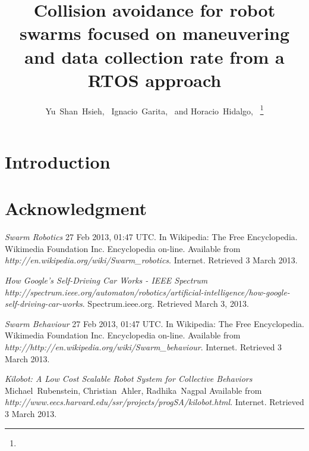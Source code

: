 \documentclass[journal]{IEEEtran}
\begin{document}
\title{Collision avoidance for robot swarms focused on maneuvering and data collection rate from a RTOS approach}

\author{Yu~Shan~Hsieh,~
   Ignacio~Garita,~
   and Horacio~Hidalgo,~%
\thanks{}%
%
}

\maketitle

\begin{abstract}

\end{abstract}

\section{Introduction}

\section*{Acknowledgment}

\ifCLASSOPTIONcaptionsoff
  \newpage
\fi
\begin{thebibliography}{1}


\emph{Swarm Robotics} 27 Feb 2013, 01:47 UTC. In Wikipedia: The Free Encyclopedia. Wikimedia Foundation Inc.
Encyclopedia on-line.
Available from \textit{http://en.wikipedia.org/wiki/Swarm\_robotics}. Internet. Retrieved 3 March 2013.

\emph{How Google's Self-Driving Car Works - IEEE Spectrum} \textit{http://spectrum.ieee.org/automaton/robotics/artificial-intelligence/how-google-self-driving-car-works}.
Spectrum.ieee.org. Retrieved March 3, 2013. 


\emph{Swarm Behaviour} 27 Feb 2013, 01:47 UTC. In Wikipedia: The Free Encyclopedia. Wikimedia Foundation Inc.
Encyclopedia on-line.
Available from \textit{http://http://en.wikipedia.org/wiki/Swarm\_behaviour}. Internet. Retrieved 3 March 2013.


\emph{Kilobot: A Low Cost Scalable Robot System for Collective Behaviors} Michael~Rubenstein, Christian~Ahler, Radhika~Nagpal
Available from \textit{http://www.eecs.harvard.edu/ssr/projects/progSA/kilobot.html}. Internet. Retrieved 3 March 2013.


\end{thebibliography}
\end{document}
